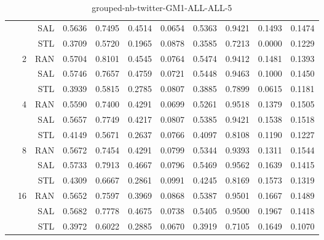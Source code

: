 \begin{center}
\begin{table}[htbp]
\begin{tabular}{ | r | r | r | r | r | r | r | r | r | r | r |}
 &   & SAL & 0.5636 & 0.7495 & 0.4514 & 0.0654 & 0.5363 & 0.9421 & 0.1493 & 0.1474\\ \cline{3-11}
 &   & STL & 0.3709 & 0.5720 & 0.1965 & 0.0878 & 0.3585 & 0.7213 & 0.0000 & 0.1229\\ \cline{2-11}
 & \multirow{3}{*}{2} & RAN & 0.5704 & 0.8101 & 0.4545 & 0.0764 & 0.5474 & 0.9412 & 0.1481 & 0.1393\\ \cline{3-11}
 &   & SAL & 0.5746 & 0.7657 & 0.4759 & 0.0721 & 0.5448 & 0.9463 & 0.1000 & 0.1450\\ \cline{3-11}
 &   & STL & 0.3939 & 0.5815 & 0.2785 & 0.0807 & 0.3885 & 0.7899 & 0.0615 & 0.1181\\ \cline{2-11}
 & \multirow{3}{*}{4} & RAN & 0.5590 & 0.7400 & 0.4291 & 0.0699 & 0.5261 & 0.9518 & 0.1379 & 0.1505\\ \cline{3-11}
 &   & SAL & 0.5657 & 0.7749 & 0.4217 & 0.0807 & 0.5385 & 0.9421 & 0.1538 & 0.1518\\ \cline{3-11}
 &   & STL & 0.4149 & 0.5671 & 0.2637 & 0.0766 & 0.4097 & 0.8108 & 0.1190 & 0.1227\\ \cline{2-11}
 & \multirow{3}{*}{8} & RAN & 0.5672 & 0.7454 & 0.4291 & 0.0799 & 0.5344 & 0.9393 & 0.1311 & 0.1544\\ \cline{3-11}
 &   & SAL & 0.5733 & 0.7913 & 0.4667 & 0.0796 & 0.5469 & 0.9562 & 0.1639 & 0.1415\\ \cline{3-11}
 &   & STL & 0.4309 & 0.6667 & 0.2861 & 0.0991 & 0.4245 & 0.8169 & 0.1573 & 0.1319\\ \cline{2-11}
 & \multirow{3}{*}{16} & RAN & 0.5652 & 0.7597 & 0.3969 & 0.0868 & 0.5387 & 0.9501 & 0.1667 & 0.1489\\ \cline{3-11}
 &   & SAL & 0.5682 & 0.7778 & 0.4675 & 0.0738 & 0.5405 & 0.9500 & 0.1967 & 0.1418\\ \cline{3-11}
 &   & STL & 0.3972 & 0.6022 & 0.2885 & 0.0670 & 0.3919 & 0.7105 & 0.1649 & 0.1070\\ \cline{2-11}
\hline
\end{tabular}
\caption{grouped-nb-twitter-GM1-ALL-ALL-5}
\end{table}
\end{center}

